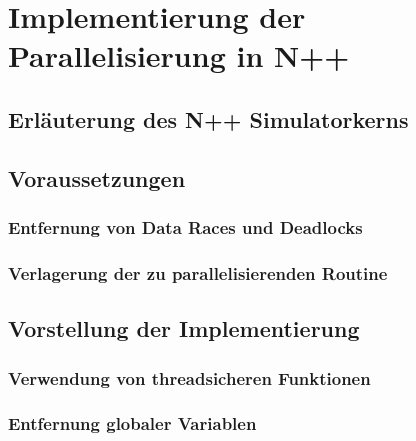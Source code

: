 \chapter{Implementierung der Parallelisierung in N++}
\label{ch:Zielstellung}

\section{Erläuterung des N++ Simulatorkerns}
\label{sec:Zielstellung_Forschungsfrage}

\section{Voraussetzungen}
\label{sec:Zielstellung_Szenarien}

\subsection{Entfernung von Data Races und Deadlocks}
\label{sec:Zielstellung_Szenarien}

\subsection{Verlagerung der zu parallelisierenden Routine}
\label{sec:Zielstellung_Szenarien}

\section{Vorstellung der Implementierung}
\label{sec:Zielstellung_Szenarien}

\subsection{Verwendung von threadsicheren Funktionen}
\label{sec:Zielstellung_Szenarien}

\subsection{Entfernung globaler Variablen}
\label{sec:Zielstellung_Szenarien}